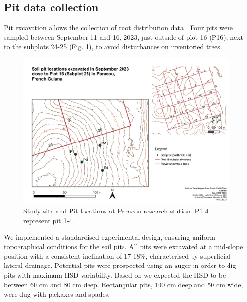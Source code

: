 \documentclass[fleqn,11pt]{latex/stylish_article} %
\begin{document}
\hypertarget{pit-data-collection}{%
\subsection{Pit data collection}\label{pit-data-collection}}

Pit excavation allows the collection of root distribution data \citep{freschetStartingGuideRoot2021}. Four pits were sampled between September 11 and 16, 2023, just outside of plot 16 (P16), next to the subplots 24-25 (Fig. 1), to avoid disturbances on inventoried trees.



\scriptsize

\begin{figure}

{\centering \includegraphics[width=0.9\linewidth]{images/Pitlocations2} 

}

\caption{Study site and Pit locations at Paracou research station. P1-4 represent pit 1-4.}\label{fig:Pitlocations2}
\end{figure}

\normalsize

We implemented a standardised experimental design, ensuring uniform topographical conditions for the soil pits. All pits were excavated at a mid-slope position with a consistent inclination of 17-18\%, characterised by superficial lateral drainage. Potential pits were prospected using an auger in order to dig pits with maximum HSD variability. Based on \citep{epronSpatialVariationSoil2006} we expected the HSD to be between 60 cm and 80 cm deep. Rectangular pits, 100 cm deep and 50 cm wide, were dug with pickaxes and spades.
\end{document}
